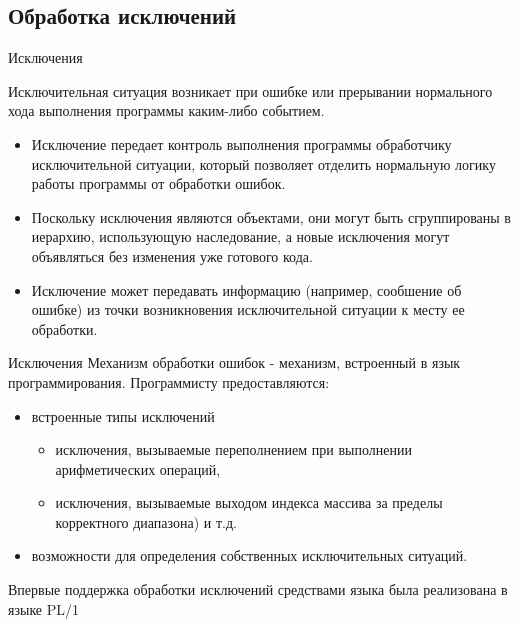 \documentclass{beamer}
\begin{document}
\subsection{Обработка исключений}

\begin{frame}{Исключения}
\begin{block}{Исключительная ситуация }
возникает при ошибке или прерывании нормального хода выполнения программы каким-либо событием.
\end{block}
\begin{itemize}
\item Исключение передает контроль выполнения программы обработчику исключительной ситуации, который позволяет отделить нормальную логику работы программы от обработки ошибок. 
\item Поскольку исключения являются объектами, они могут быть сгруппированы в иерархию, использующую наследование, а новые исключения могут объявляться без изменения уже готового кода. \item Исключение может передавать информацию (например, сообшение об ошибке) из точки возникновения исключительной ситуации к месту ее обработки.
\end{itemize}
\end{frame}

\begin{frame}{Исключения}
Механизм обработки ошибок - механизм, встроенный в язык программирования.
Программисту предоставляются:
\begin{itemize}
\item встроенные типы исключений
\begin{itemize}
\item исключения, вызываемые переполнением при выполнении арифметических
операций, 
\item исключения, вызываемые выходом индекса массива за пределы
корректного диапазона) и т.д.
\end{itemize} 
\item возможности для определения собственных исключительных ситуаций.
\end{itemize}
Впервые поддержка обработки исключений средствами языка была реализована в языке PL/1
\end{frame}
\end{document}
